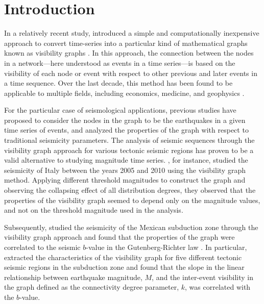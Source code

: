 
\section{Introduction}

In a relatively recent study, \citet{Lacasa2008} introduced a simple and computationally inexpensive approach to convert time-series into a particular kind of mathematical graphs known as visibility graphs . In this approach, the connection between the nodes in a network---here understood as events in a time series---is based on the visibility of each node or event with respect to other previous and later events in a time sequence. Over the last decade, this method has been found to be applicable to multiple fields, including economics, medicine, and geophysics   \citep[e.g.,][]{Yang_2009_PA, Elsner_2009_GRL, Telesca2012_CSF, Wang2012, Long2013}.

For the particular case of seismological applications, previous studies have proposed to consider the nodes in the graph to be the earthquakes in a given time series of events, and analyzed the properties of the graph with respect to traditional seismicity parameters. The analysis of seismic sequences through the visibility graph approach for various tectonic seismic regions has proven to be a valid alternative to studying magnitude time series. \citet{Telesca2012}, for instance, studied the seismicity of Italy between the years 2005 and 2010 using the visibility graph method. Applying different threshold magnitudes to construct the graph and observing the collapsing effect of all distribution degrees, they observed that the properties of the visibility graph seemed to depend only on the magnitude values, and not on the threshold magnitude used in the analysis. 

Subsequently, \citet{Telesca2013} studied the seismicity of the Mexican subduction zone through the visibility graph approach and found that the properties of the graph were correlated to the seismic $b$-value in the Gutenberg-Richter law \citep{Gutenberg1944}. In particular, \citet{Telesca2013} extracted the characteristics of the visibility graph for five different tectonic seismic regions in the subduction zone and found that the slope in the linear relationship between earthquake magnitude, $M$, and the inter-event visibility in the graph defined as the connectivity degree parameter, $k$, was correlated with the $b$-value.

